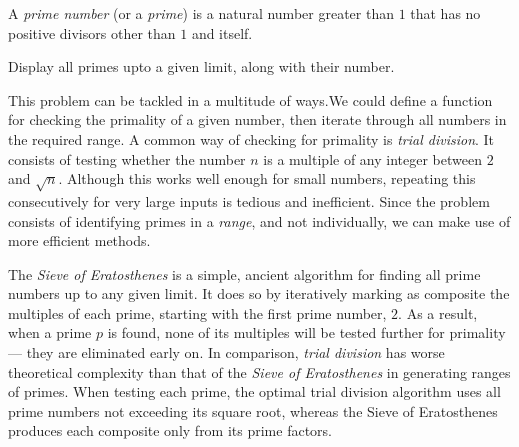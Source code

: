 

\problem A {\em prime number} (or a {\em prime}) is a natural number greater than $1$ that has no positive divisors other than $1$ and itself.

Display all primes upto a given limit, along with their number.

\solution This problem can be tackled in a multitude of ways.\citeneeded We could define a function for checking the primality of a given number, then iterate through all numbers in the required range. A common way of checking for primality is {\em trial division}. It consists of testing whether the number $n$ is a multiple of any integer between $2$ and $\sqrt{n}$. Although this works well enough for small numbers, repeating this consecutively for very large inputs is tedious and inefficient. Since the problem consists of identifying primes in a {\em range}, and not individually, we can make use of more efficient methods.

The {\em Sieve of Eratosthenes} is a simple, ancient algorithm for finding all prime numbers up to any given limit.
It does so by iteratively marking as composite the multiples of each prime, starting with the first prime number, $2$.
As a result, when a prime $p$ is found, none of its multiples will be tested further for primality --- they are eliminated early on.
In comparison, {\em trial division} has worse theoretical complexity than that of the {\em Sieve of Eratosthenes} in generating ranges of primes. When testing each prime, the optimal trial division algorithm uses all prime numbers not exceeding its square root, whereas the Sieve of Eratosthenes produces each composite only from its prime factors.


